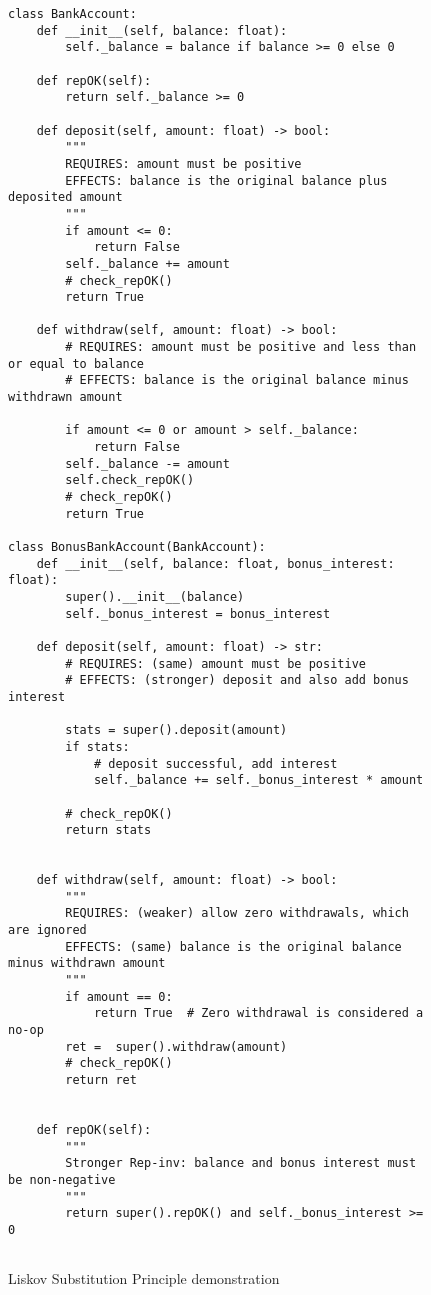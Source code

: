 \documentclass[oneside,11pt,dvipsnames]{book}
\begin{document}

\begin{figure}
    \begin{lstlisting}
class BankAccount:
    def __init__(self, balance: float):
        self._balance = balance if balance >= 0 else 0  
        
    def repOK(self):
        return self._balance >= 0

    def deposit(self, amount: float) -> bool:
        """
        REQUIRES: amount must be positive
        EFFECTS: balance is the original balance plus deposited amount
        """
        if amount <= 0:
            return False
        self._balance += amount
        # check_repOK()
        return True

    def withdraw(self, amount: float) -> bool:
        # REQUIRES: amount must be positive and less than or equal to balance
        # EFFECTS: balance is the original balance minus withdrawn amount

        if amount <= 0 or amount > self._balance:
            return False
        self._balance -= amount
        self.check_repOK()
        # check_repOK()
        return True

class BonusBankAccount(BankAccount):
    def __init__(self, balance: float, bonus_interest: float):
        super().__init__(balance)
        self._bonus_interest = bonus_interest

    def deposit(self, amount: float) -> str:
        # REQUIRES: (same) amount must be positive
        # EFFECTS: (stronger) deposit and also add bonus interest

        stats = super().deposit(amount)
        if stats:
            # deposit successful, add interest
            self._balance += self._bonus_interest * amount
        
        # check_repOK()
        return stats


    def withdraw(self, amount: float) -> bool:
        """
        REQUIRES: (weaker) allow zero withdrawals, which are ignored
        EFFECTS: (same) balance is the original balance minus withdrawn amount
        """
        if amount == 0:
            return True  # Zero withdrawal is considered a no-op
        ret =  super().withdraw(amount)
        # check_repOK()
        return ret
    
    
    def repOK(self):
        """
        Stronger Rep-inv: balance and bonus interest must be non-negative
        """
        return super().repOK() and self._bonus_interest >= 0
        
    \end{lstlisting}
\caption{Liskov Substitution Principle demonstration}\label{ex:bankaccount}
\end{figure}
\end{document}
